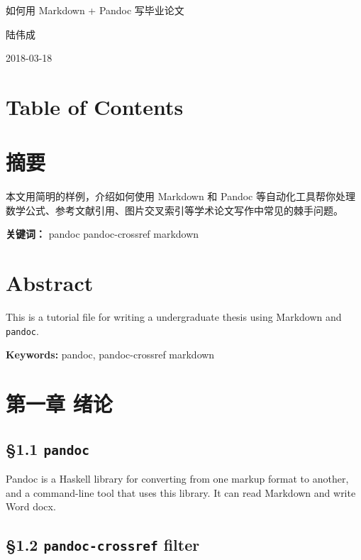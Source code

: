 \documentclass[
]{article}
\date{}
\begin{document}
如何用 Markdown + Pandoc 写毕业论文

陆伟成

2018-03-18

\hypertarget{table-of-contents}{%
\section{Table of Contents}\label{table-of-contents}}

\hypertarget{ux6458ux8981}{%
\section{摘要}\label{ux6458ux8981}}

本文用简明的样例，介绍如何使用 Markdown 和 Pandoc
等自动化工具帮你处理数学公式、参考文献引用、图片交叉索引等学术论文写作中常见的棘手问题。

\textbf{关键词：} pandoc pandoc-crossref markdown

\hypertarget{abstract}{%
\section{Abstract}\label{abstract}}

This is a tutorial file for writing a undergraduate thesis using
Markdown and \texttt{pandoc}.

\textbf{Keywords:} pandoc, pandoc-crossref markdown

\hypertarget{ux7b2cux4e00ux7ae0-ux7eeaux8bba}{%
\section{第一章 绪论}\label{ux7b2cux4e00ux7ae0-ux7eeaux8bba}}

\hypertarget{pandoc}{%
\subsection{\texorpdfstring{§1.1
\texttt{pandoc}}{§1.1 pandoc}}\label{pandoc}}

Pandoc is a Haskell library for converting from one markup format to
another, and a command-line tool that uses this library. It can read
Markdown and write Word docx.

\hypertarget{pandoc-crossref-filter}{%
\subsection{\texorpdfstring{§1.2 \texttt{pandoc-crossref}
filter}{§1.2 pandoc-crossref filter}}\label{pandoc-crossref-filter}}
\end{document}
